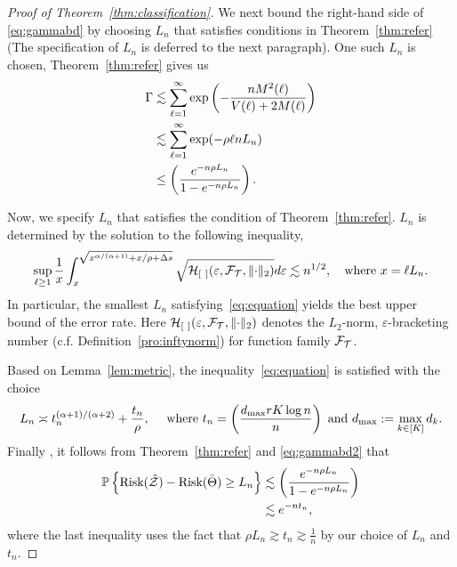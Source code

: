 \documentclass[11pt]{article}
\theoremstyle{plain}
\theoremstyle{definition}
\def\risk{\textup{Risk}}
\begin{document}
\begin{proof}[Proof of Theorem~\ref{thm:classification}]
We next bound the right-hand side of \eqref{eq:gammabd} by choosing $L_n$ that satisfies conditions in Theorem~\ref{thm:refer} (The specification of $L_n$ is deferred to the next paragraph). One such $L_n$ is chosen, Theorem~\ref{thm:refer} gives us 
\begin{align}\label{eq:gammabd2}
\Gamma&\lesssim \sum_{\ell=1}^\infty \exp\left(-\frac{nM^2(\ell)}{V(\ell)+2M(\ell)}\right)\\&\lesssim \sum_{\ell=1}^\infty	\exp(-\rho  \ell n L_n)\\&\leq \left(e^{-n\rho L_n}\over 1-e^{-n\rho L_n}\right).
\end{align}

Now, we specify $L_n$ that satisfies the condition of Theorem~\ref{thm:refer}.  $L_n$ is determined by the solution to the following inequality,
\begin{equation}\label{eq:equation}
\sup_{\ell\geq 1}{1\over x}\int_{x}^{\sqrt{x^{\alpha/(\alpha+1)}+x/\rho+\Delta s}}\sqrt{\tH_{[\ ]}(\varepsilon, \tF_{\tT},\vnormSize{}{\cdot})}d\varepsilon \lesssim n^{1/2}, \quad \text{where }x=\ell L_n.
\end{equation}
In particular, the smallest $L_n$ satisfying~\eqref{eq:equation} yields the best upper bound of the error rate. Here $\tH_{[\ ]}(\varepsilon, \tF_{\tT}, \vnormSize{}{\cdot})$ denotes the $L_2$-norm, $\varepsilon$-bracketing number (c.f. Definition~\ref{pro:inftynorm}) for function family $\mathcal{F}_{\mathcal{T}}$.

Based on Lemma~\ref{lem:metric}, the inequality~\eqref{eq:equation} is satisfied with the choice
\begin{equation}\label{eq:delta}
L_n\asymp  t_n^{(\alpha+1)/(\alpha+2)}+{t_n\over \rho}, \quad \text{ where } t_n = \left(d_{\max}rK \log n\over n\right) \text{ and } d_{\max} := \max_{k\in[K]} d_k.
\end{equation}
Finally , it follows from Theorem~\ref{thm:refer} and \eqref{eq:gammabd2} that 
\begin{align}
\mathbb{P}\left\{\risk(\hat \tZ)-\risk(\bar\Theta)\geq L_n\right\}&\lesssim \left(e^{-n\rho L_n}\over 1-e^{-n\rho L_n}\right)\\&\lesssim e^{-nt_n},
\end{align}
where the last inequality uses the fact that $\rho L_n\gtrsim t_n\gtrsim \frac{1}{n}$ by our choice of $L_n$ and $t_n$.



\end{proof}
\end{document}
